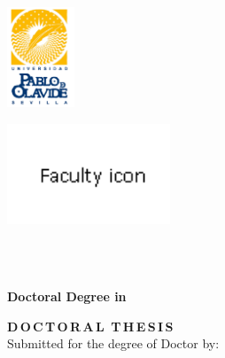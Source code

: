 
\begin{minipage}{0.20\textwidth}
        \includegraphics[width = 1\linewidth, height = 3cm, keepaspectratio]{figures/upo_icon_vertical.png}
\end{minipage}
\begin{minipage}{0.20\textwidth}
        \includegraphics[width = 1\linewidth, height = 3cm, keepaspectratio]{figures/faculty_icon.png}
\end{minipage}
\begin{minipage}{0.65\textwidth} \centering
    {\UNIVERSITY}\\
    {\UPOCentre}\\
\end{minipage}

\vspace{15 mm}

\begin{center}
\begin{spacing}{1.5}
\textbf{\large {Doctoral Degree in {\DoctoralProgramme}}}\\
\end{spacing}
\vspace{10 mm}

\begin{spacing}{2.0}
\textbf{\LARGE {\thesisTitle}}
\end{spacing}

\vspace{15 mm}

\begin{spacing}{1.3}
\textbf{\LARGE {D\,O\,C\,T\,O\,R\,A\,L\, T\,H\,E\,S\,I\,S}}\\
\medskip
{\large {Submitted for the degree of Doctor by:}}
\end{spacing}
\end{center}



